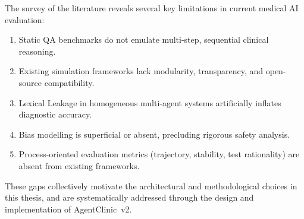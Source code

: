 The survey of the literature reveals several key limitations in current medical AI evaluation:
\begin{enumerate}
    \item Static QA benchmarks do not emulate multi-step, sequential clinical reasoning.
    \item Existing simulation frameworks lack modularity, transparency, and open-source compatibility.
    \item Lexical Leakage in homogeneous multi-agent systems artificially inflates diagnostic accuracy.
    \item Bias modelling is superficial or absent, precluding rigorous safety analysis.
    \item Process-oriented evaluation metrics (trajectory, stability, test rationality) are absent from existing frameworks.
\end{enumerate}

These gaps collectively motivate the architectural and methodological choices in this thesis, and are systematically addressed through the design and implementation of AgentClinic~v2.
